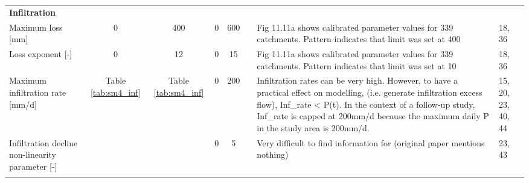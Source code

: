 \begin{longtable}{p{11.215em}ccccp{13em}p{13em}l}
\textbf{Infiltration} &       &       &       &       & \multicolumn{1}{l}{} & \multicolumn{1}{l}{} &  \\
    Maximum loss [mm] & 0     & 400   & 0     & 600   & \cite{Chiew2002} & Fig 11.11a shows calibrated parameter values for 339 catchments. Pattern indicates that limit was set at 400 & \multicolumn{1}{p{10em}}{18, 36} \\
    Loss exponent [-] & 0     & 12    & 0     & 15    & \cite{Chiew2002} & Fig 11.11a shows calibrated parameter values for 339 catchments. Pattern indicates that limit was set at 10 & \multicolumn{1}{p{10em}}{18, 36} \\
    Maximum infiltration rate [mm/d] & \multicolumn{1}{p{3.57em}}{Table \ref{tab:sm4_inf}} & \multicolumn{1}{p{3.785em}}{Table \ref{tab:sm4_inf}} & 0     & 200   & \multicolumn{1}{l}{} & Infiltration rates can be very high. However, to have a practical effect on modelling, (i.e. generate infiltration excess flow), Inf\_rate < P(t). In the context of a follow-up study, Inf\_rate is capped at 200mm/d because the maximum daily P in the study area is 200mm/d. & \multicolumn{1}{p{10em}}{15, 20, 23, 40, 44} \\
    Infiltration decline non-linearity parameter [-] &       &       & 0     & 5     & \cite{Sivapalan1996a} & Very difficult to find information for (original paper mentions nothing) & \multicolumn{1}{p{10em}}{23, 43} \\
    \multicolumn{1}{l}{} &       &       &       &       & \multicolumn{1}{l}{} & \multicolumn{1}{l}{} &  \\


\end{longtable}
